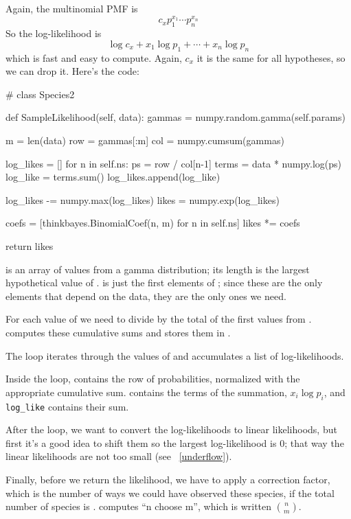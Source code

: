 \documentclass[12pt]{book}
\theoremstyle{exercise}
\begin{document}
Again, the multinomial PMF is
%
\[ c_x p_1^{x_1} \cdots p_n^{x_n} \]
%
So the log-likelihood is
%
\[ \log c_x + x_1 \log p_1 + \cdots + x_n \log p_n \]
%
which is fast and easy to compute.  Again, $c_x$
it is the same for all hypotheses, so we can drop it.
Here's the code:

\begin{code}
# class Species2

    def SampleLikelihood(self, data):
        gammas = numpy.random.gamma(self.params)

        m = len(data)
        row = gammas[:m]
        col = numpy.cumsum(gammas)

        log_likes = []
        for n in self.ns:
            ps = row / col[n-1]
            terms = data * numpy.log(ps)
            log_like = terms.sum()
            log_likes.append(log_like)

        log_likes -= numpy.max(log_likes)
        likes = numpy.exp(log_likes)

        coefs = [thinkbayes.BinomialCoef(n, m) for n in self.ns]
        likes *= coefs

        return likes
\end{code}

 is an array of values from a gamma distribution; its
length is the largest hypothetical value of .   is
just the first  elements of ; since these are the
only elements that depend on the data, they are the only ones we need.

For each value of  we need to divide  by the
total of the first  values from .  
computes these cumulative sums and stores them in .

The loop iterates through the values of  and accumulates
a list of log-likelihoods.

Inside the loop,  contains the row of probabilities, normalized
with the appropriate cumulative sum.   contains the
terms of the summation, $x_i \log p_i$, and \verb"log_like" contains
their sum.

After the loop, we want to convert the log-likelihoods to linear
likelihoods, but first it's a good idea to shift them so the largest
log-likelihood is 0; that way the linear likelihoods are not too
small (see ~\ref{underflow}).

Finally, before we return the likelihood, we have to apply a correction
factor, which is the number of ways we could have observed these 
species, if the total number of species is .  
 computes ``n choose m'', which is written
$\binom{n}{m}$. 
\end{document}
